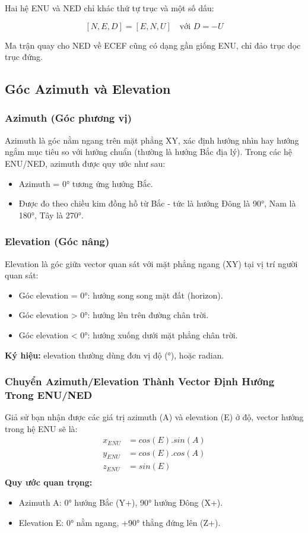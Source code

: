 Hai hệ ENU và NED chỉ khác thứ tự trục và một số dấu:


\[
[N, E, D] = [E, N, U] \quad \text{với } D = -U
\]



Ma trận quay cho NED về ECEF cũng có dạng gần giống ENU, chỉ đảo trục dọc trục đứng.


\subsection{Góc Azimuth và Elevation}
\subsubsection{Azimuth (Góc phương vị)}
Azimuth là góc nằm ngang trên mặt phẳng XY, xác định hướng nhìn hay hướng ngắm mục tiêu so với hướng chuẩn (thường là hướng Bắc địa lý). Trong các hệ ENU/NED, azimuth được quy ước như sau:
\begin{itemize}
    \item Azimuth = 0° tương ứng hướng Bắc.
    \item Được đo theo chiều kim đồng hồ từ Bắc - tức là hướng Đông là 90°, Nam là 180°, Tây là 270°.
\end{itemize}
\subsubsection{Elevation (Góc nâng)}
Elevation là góc giữa vector quan sát với mặt phẳng ngang (XY) tại vị trí người quan sát:
\begin{itemize}
    \item Góc elevation = 0°: hướng song song mặt đất (horizon).
    \item Góc elevation > 0°: hướng lên trên đường chân trời.
    \item Góc elevation < 0°: hướng xuống dưới mặt phẳng chân trời.
\end{itemize}
\textbf{Ký hiệu: }elevation thường dùng đơn vị độ (°), hoặc radian.

\subsubsection{Chuyển Azimuth/Elevation Thành Vector Định Hướng Trong ENU/NED}
Giả sử bạn nhận được các giá trị azimuth (A) và elevation (E) ở độ, vector hướng trong hệ ENU sẽ là:
$$
\begin{aligned}
x_{ENU} &= cos(E).sin(A) \\
y_{ENU} &= cos(E).cos(A) \\
z_{ENU} &= sin(E) \\
\end{aligned}
$$
\textbf{Quy ước quan trọng: }
\begin{itemize}
    \item Azimuth A: 0° hướng Bắc (Y+), 90° hướng Đông (X+).
    \item Elevation E: 0° nằm ngang, +90° thẳng đứng lên (Z+).
\end{itemize}

